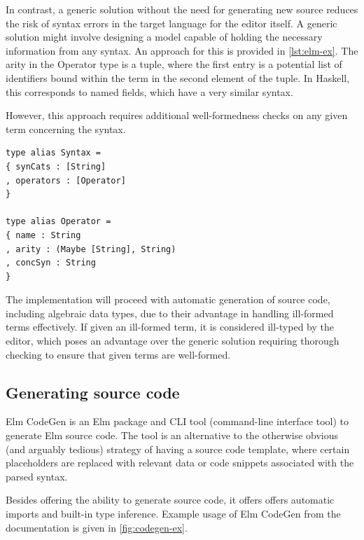 In contrast, a generic solution without the need for generating new source reduces the risk of syntax errors in the target language for the editor itself. A generic solution might involve designing a model capable of holding the necessary information from any syntax. An approach for this is provided in \cref{lst:elm-ex}.
The arity in the Operator type is a tuple, where the first entry is a potential
list of identifiers bound within the term in the second element of the tuple.
In Haskell, this corresponds to named fields\cite{haskell-records-named-fields},
which have a very similar syntax.

However, this approach requires additional well-formedness checks on any given term concerning the syntax.

\begin{minipage}{\textwidth}
  \begin{lstlisting}[style=inline,caption={Elm Records for storing syntax information},label={lst:elm-ex}]
type alias Syntax =
{ synCats : [String]
, operators : [Operator]
}

type alias Operator =
{ name : String
, arity : (Maybe [String], String)
, concSyn : String
}
\end{lstlisting}
\end{minipage}

The implementation will proceed with automatic generation of source code,
including algebraic data types, due to their advantage in handling ill-formed
terms effectively. If given an ill-formed term, it is considered ill-typed by
the editor, which poses an advantage over the generic solution requiring
thorough checking to ensure that given terms are well-formed.

\subsection{Generating source code}
Elm CodeGen\cite{elm-codegen-package} is an Elm package and
CLI tool (command-line interface tool) to generate Elm source code.
The tool is an alternative to the otherwise obvious (and arguably tedious)
strategy of having a source code template, where certain placeholders are
replaced with relevant data or code snippets associated with the parsed syntax.

Besides offering the ability to generate source code, it offers offers automatic
imports and built-in type inference. Example usage of Elm CodeGen from
the documentation\cite{elm-codegen-package} is given in \cref{fig:codegen-ex}.

